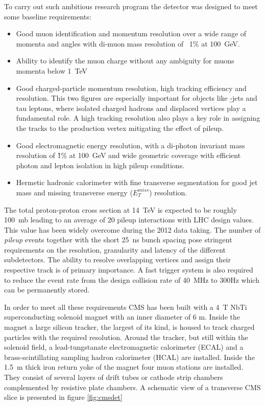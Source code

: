 To carry out such ambitious research program the detector was designed to meet some baseline requirements:
\begin{itemize}
\item Good muon identification and momentum resolution over a wide range of momenta and angles with di-muon mass resolution of ~1\% at 100~GeV.
\item Ability to identify the muon charge without any ambiguity for muons momenta below 1~TeV
\item Good charged-particle momentum resolution, high tracking efficiency and resolution. This two figures are especially important for objects like \b-jets and tau leptons, where isolated charged hadrons and displaced vertices play a fundamental role. A high tracking resolution also plays a key role in assigning the tracks to the production vertex mitigating the effect of pileup.
\item Good electromagnetic energy resolution, with a di-photon invariant mass resolution of \~1\% at 100~GeV and wide geometric coverage with efficient photon and lepton isolation in high pileup conditions.
\item Hermetic hadronic calorimeter with fine transverse segmentation for good jet mass and missing transverse energy ($E_T^{miss}$) resolution. 
\end{itemize}

The total proton-proton cross section at 14~TeV is expected to be roughly 100~mb leading to an average of 20 pileup interactions with LHC design values. This value has been widely overcome during the 2012 data taking. The number of \emph{pileup} events together with the short 25~ns bunch spacing pose stringent requirements on the resolution, granularity and latency of the different subdetectors. The ability to resolve overlapping vertices and assign their respective track is of primary importance. A fast trigger system is also required to reduce the event rate from the design collision rate of 40~MHz to 300Hz which can be permanently stored.

In order to meet all these requirements CMS has been built with a 4~T NbTi superconducting solenoid magnet with an inner diameter of 6 m. Inside the magnet a large silicon tracker, the largest of its kind, is housed to track charged particles with the required resolution. Around the tracker, but still within the solenoid field, a lead-tungstanate electromagnetic calorimeter (ECAL) and a brass-scintillating sampling hadron calorimeter (HCAL) are installed. Inside the 1.5~m thick iron return yoke of the magnet four muon stations are installed. They consist of several layers of drift tubes or cathode strip chambers complemented by resistive plate chambers. A schematic view of a transverse CMS slice is presented in figure \ref{fig:cmsdet}


